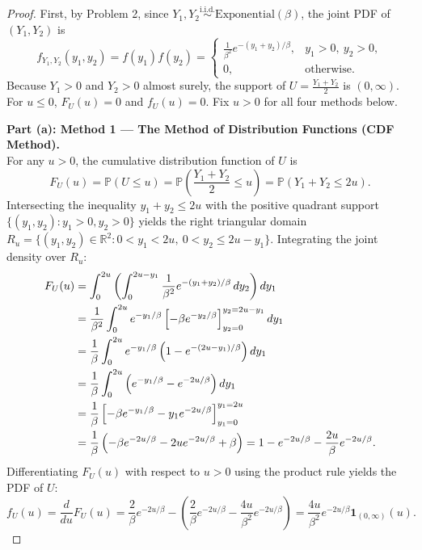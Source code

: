 \documentclass[11pt, letterpaper]{article}
\theoremstyle{definition}
\theoremstyle{remark}
\newcommand{\R}{\mathbb{R}}
\newcommand{\Prob}{\mathbb{P}}
\begin{document}
\begin{proof}
First, by Problem 2, since $Y_1, Y_2 \stackrel{\text{i.i.d.}}{\sim} \text{Exponential}(\beta)$, the joint PDF of $(Y_1, Y_2)$ is
\[
    f_{Y_1, Y_2}(y_1, y_2) = f(y_1)f(y_2) = \begin{cases} \frac{1}{\beta^2} e^{-(y_1 + y_2)/\beta}, & y_1 > 0, \ y_2 > 0, \\ 0, & \text{otherwise.} \end{cases}
\]
Because $Y_1 > 0$ and $Y_2 > 0$ almost surely, the support of $U = \frac{Y_1 + Y_2}{2}$ is $(0, \infty)$. For $u \le 0$, $F_U(u) = 0$ and $f_U(u) = 0$. Fix $u > 0$ for all four methods below.

\textbf{Part (a): Method 1 — The Method of Distribution Functions (CDF Method).} \\ \relax
For any $u > 0$, the cumulative distribution function of $U$ is
\[
    F_U(u) = \Prob(U \le u) = \Prob\left(\frac{Y_1 + Y_2}{2} \le u\right) = \Prob(Y_1 + Y_2 \le 2u).
\]
Intersecting the inequality $y_1 + y_2 \le 2u$ with the positive quadrant support $\{(y_1, y_2) : y_1 > 0, y_2 > 0\}$ yields the right triangular domain $R_u = \{(y_1, y_2) \in \R^2 : 0 < y_1 < 2u, \ 0 < y_2 \le 2u - y_1\}$. Integrating the joint density over $R_u$:
\begin{align*}
    F_U(u) &= \int_{0}^{2u} \left( \int_{0}^{2u - y_1} \frac{1}{\beta^2} e^{-(y_1 + y_2)/\beta} \, dy_2 \right) dy_1 \\ \relax
    &= \frac{1}{\beta^2} \int_{0}^{2u} e^{-y_1/\beta} \left[ -\beta e^{-y_2/\beta} \right]_{y_2 = 0}^{y_2 = 2u - y_1} dy_1 \\ \relax
    &= \frac{1}{\beta} \int_{0}^{2u} e^{-y_1/\beta} \left( 1 - e^{-(2u - y_1)/\beta} \right) dy_1 \\ \relax
    &= \frac{1}{\beta} \int_{0}^{2u} \left( e^{-y_1/\beta} - e^{-2u/\beta} \right) dy_1 \\ \relax
    &= \frac{1}{\beta} \left[ -\beta e^{-y_1/\beta} - y_1 e^{-2u/\beta} \right]_{y_1 = 0}^{y_1 = 2u} \\ \relax
    &= \frac{1}{\beta} \left( -\beta e^{-2u/\beta} - 2u e^{-2u/\beta} + \beta \right) = 1 - e^{-2u/\beta} - \frac{2u}{\beta} e^{-2u/\beta}.
\end{align*}
Differentiating $F_U(u)$ with respect to $u > 0$ using the product rule yields the PDF of $U$:
\[
    f_U(u) = \frac{d}{du} F_U(u) = \frac{2}{\beta} e^{-2u/\beta} - \left( \frac{2}{\beta} e^{-2u/\beta} - \frac{4u}{\beta^2} e^{-2u/\beta} \right) = \frac{4u}{\beta^2} e^{-2u/\beta} \mathbf{1}_{(0, \infty)}(u).
\]


\end{proof}
\end{document}
